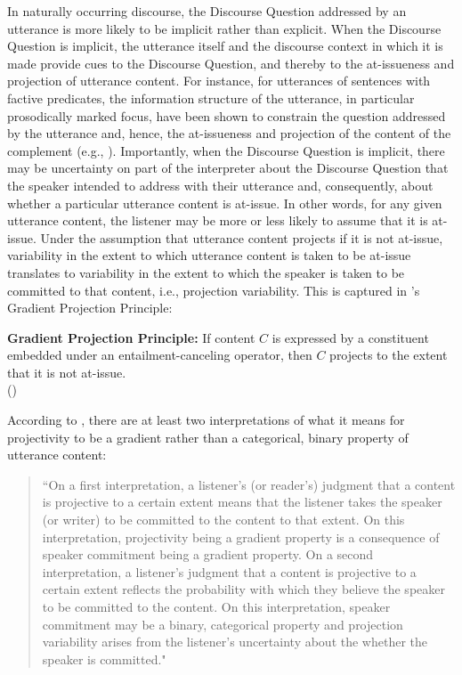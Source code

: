 \documentclass[11pt,fleqn]{article}
\newcommand{\6}{\mbox{$[\hspace*{-.6mm}[$}}
\newcommand{\9}{\mbox{$]\hspace*{-.6mm}]$}}
\newcommand{\citepos}[1]{\citeauthor{#1}'s \citeyear{#1}}
\begin{document}
In naturally occurring discourse, the Discourse Question addressed by an utterance is more likely to be implicit rather than explicit. When the Discourse Question is implicit, the utterance itself and the discourse context in which it is made provide cues to the Discourse Question, and thereby to the at-issueness and projection of utterance content. For instance, for utterances of sentences with factive predicates, the information structure of the utterance, in particular prosodically marked focus, have been shown to constrain the question addressed by the utterance and, hence, the at-issueness and projection of the content of the complement (e.g., \citealt{beaver01,cummins-rohde2015,tonhauser-salt26,best-question,djaerv-bacovcin-salt27,mahler-nels}). Importantly, when the Discourse Question is implicit, there may be uncertainty on part of the interpreter about the Discourse Question that the speaker intended to address with their utterance and, consequently, about whether a particular utterance content is at-issue. In other words, for any given utterance content, the listener may be more or less likely to assume that it is at-issue. Under the assumption that utterance content projects if it is not at-issue, variability in the extent to which utterance content is taken to be at-issue translates to variability in the extent to which the speaker is taken to be committed to that content, i.e., projection variability. This is captured in \citepos{tbd-variability} Gradient Projection Principle:

\begin{exe}
\ex\label{gpp} {\bf Gradient Projection Principle:} If content $C$ is expressed by a constituent embedded under an entailment-canceling operator, then $C$ projects to the extent that it is not at-issue. \\ \hspace*{.2cm} \hfill (\citealt[499]{tbd-variability})
\end{exe}
 
According to \citealt[498f.]{tbd-variability}, there are at least two interpretations of what it means for projectivity to be a gradient rather than a categorical, binary property of utterance content: 

\begin{quote}

``On a first interpretation, a listener's (or reader's) judgment that a content is projective to a certain extent means that the listener takes the speaker (or writer) to be committed to the content to that extent. On this interpretation, projectivity being a gradient property is a consequence of speaker commitment being a gradient property. On a second interpretation, a listener's judgment that a content is projective to a certain extent reflects the probability with which they believe the speaker to be committed to the content. On this interpretation, speaker commitment may be a binary, categorical property and projection variability arises from the listener's uncertainty about the whether the speaker is committed."

\end{quote}
\end{document}
